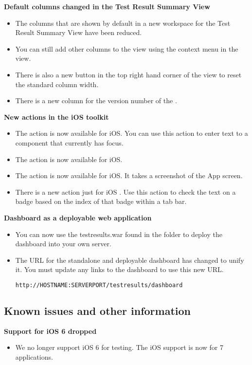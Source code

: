 \textbf{Default columns changed in the Test Result Summary View}
\begin{itemize}
\item The columns that are shown by default in a new workspace for the Test Result Summary View have been reduced.
\item You can still add other columns to the view using the context menu in the view.
\item There is also a new button in the top right hand corner of the view to reset the standard column width.
\item There is a new column for the version number of the \gdproject{}.
\end{itemize}

\textbf{New actions in the iOS toolkit}
\begin{itemize}
\item The action  is now available for iOS. You can use this action to enter text to a component that currently has focus.
\item The action  is now available for iOS.
\item The action  is now available for iOS. It takes a screenshot of the App screen.
\item There is a new action just for iOS . Use this action to check the text on a badge based on the index of that badge within a tab bar. 
\end{itemize}

\textbf{Dashboard as a deployable web application}
\begin{itemize}
\item You can now use the testresults.war found in the  folder to deploy the dashboard into your own server.
\item The URL for the standalone and deployable dashboard has changed to unify it. You must update any links to the dashboard to use this new URL.
\begin{verbatim}
http://HOSTNAME:SERVERPORT/testresults/dashboard
\end{verbatim}

\end{itemize}

\subsection{Known issues and other information}
\textbf{Support for iOS 6 dropped}
\begin{itemize}
\item We no longer support iOS 6 for testing. The iOS support is now for 7 applications. 
\end{itemize}


